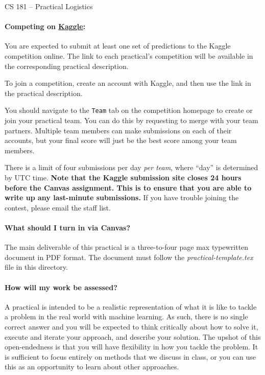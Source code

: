\documentclass[12pt,letterpaper]{article}
\begin{document}
\begin{center}
  {\large CS 181 -- Practical Logistics}
\end{center}


\paragraph{Competing on \href{https://www.kaggle.com/}{Kaggle}:} You are expected to submit at least one set of predictions to the Kaggle competition online. The link to each practical's competition will be available in the corresponding practical description.   

To join a competition, create an account with Kaggle, and then use the link in the practical description. 

You should navigate to the \texttt{Team} tab on the competition homepage to create or join your practical team. You can do this by requesting to merge with your team partners. Multiple team members can make submissions on each of their accounts, but your final score will just be the best score among your team members. 

There is a limit of four submissions per day \emph{per team}, where ``day'' is determined by UTC time.  \textbf{Note that the Kaggle submission site closes 24 hours before the Canvas assignment.  This is to ensure that you are able to write up any last-minute submissions.} If you have trouble joining the contest, please email the staff list.

\paragraph{What should I turn in via Canvas?}

The main deliverable of this practical is a three-to-four page max
typewritten document in PDF format.  The document must follow the
\textit{practical-template.tex} file in this directory.

\paragraph{How will my work be assessed?}
A practical is intended to be a realistic representation of what it
is like to tackle a problem in the real world with machine learning.
As such, there is no single correct answer and you will be expected to
think critically about how to solve it, execute and iterate your
approach, and describe your solution.  The upshot of this
open-endedness is that you will have flexibility in how you tackle the
problem.  It is sufficient to focus entirely on methods that we
discuss in class, or you can use this as an opportunity to learn about
other approaches.
\end{document}
